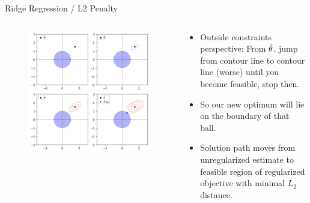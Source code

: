 \documentclass[11pt,compress,t,notes=noshow, xcolor=table]{beamer}
\begin{document}
\begin{vbframe}{Ridge Regression / L2 Penalty}
\framebreak

\begin{columns}
\begin{column}{0.5\textwidth}
\lz
\begin{figure}
\includegraphics[width=\textwidth]{figure/ridge_outside.png}
\end{figure}
\end{column}

\begin{column}{0.5\textwidth}
\begin{footnotesize} 
\begin{itemize}

	\item Outside constraints perspective: From $\hat{\theta}$, jump from contour line to contour line (worse) until you become feasible, stop then.
  \item So our new optimum will lie on the boundary of that ball.
  \item Solution path moves from unregularized estimate to feasible region of regularized objective with minimal $L_2$ distance.
\end{itemize}
\end{footnotesize}
\end{column}
\end{columns}


\end{vbframe}
\end{document}
